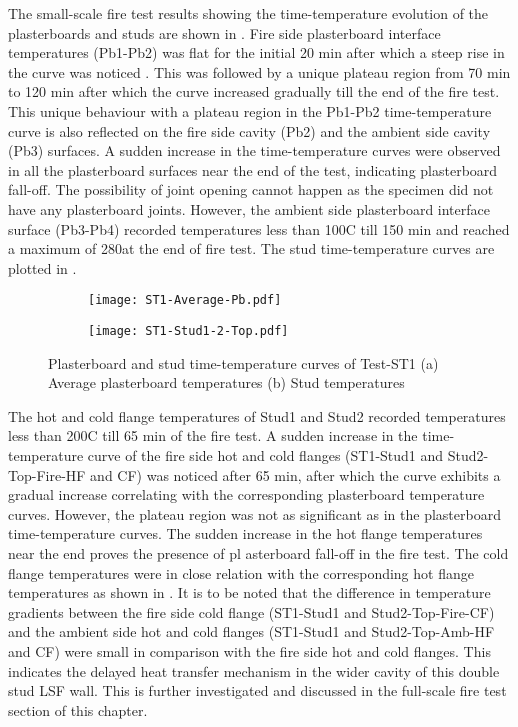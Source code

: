 The small-scale fire test results showing the time-temperature evolution of the plasterboards and studs are shown in . Fire side plasterboard interface temperatures (Pb1-Pb2) was flat for the initial 20 min after which a steep rise in the curve was noticed . This was followed by a unique plateau region from 70 min to 120 min after which the curve increased gradually till the end of the fire test. This unique behaviour with a plateau region in the Pb1-Pb2 time-temperature curve is also reflected on the fire side cavity (Pb2) and the ambient side cavity (Pb3) surfaces. A sudden increase in the time-temperature curves were observed in all the plasterboard surfaces near the end of the test, indicating plasterboard fall-off. The possibility of joint opening cannot happen as the specimen did not have any plasterboard joints. However, the ambient side plasterboard interface surface (Pb3-Pb4) recorded temperatures less than 100\degree C till 150 min and reached a maximum of 280\degree at the end of fire test. The stud time-temperature curves are plotted in .  
\begin{figure}[!htbp]
	\centering
	\begin{subfigure}[b]{0.7\textwidth}
		\centering
		\texttt{[image: ST1-Average-Pb.pdf]}
		\caption{}
		\label{subfig:ST1-Average-Pb}
	\end{subfigure}
	\begin{subfigure}[b]{0.7\textwidth}
		\centering
		\texttt{[image: ST1-Stud1-2-Top.pdf]}
		\caption{}
		\label{subfig:ST1-Stud1-2-Top}
	\end{subfigure}
	   \caption{Plasterboard and stud time-temperature curves of Test-ST1 (a) Average plasterboard temperatures (b) Stud temperatures}
	   \label{fig:ST1-PB-Stud}
\end{figure}

The hot and cold flange temperatures of Stud1 and Stud2 recorded temperatures less than 200\degree C till 65 min of the fire test. A sudden increase in the time-temperature curve of the fire side hot and cold flanges (ST1-Stud1 and Stud2-Top-Fire-HF and CF) was noticed after 65 min, after which the curve exhibits a gradual increase correlating with the corresponding plasterboard temperature curves. However, the plateau region was not as significant as in the plasterboard time-temperature curves. The sudden increase in the hot flange temperatures near the end proves the presence of pl
asterboard fall-off in the fire test. The cold flange temperatures were in close relation with the corresponding hot flange temperatures as shown in . It is to be noted that the difference in temperature gradients between the fire side cold flange (ST1-Stud1 and Stud2-Top-Fire-CF) and the ambient side hot and cold flanges (ST1-Stud1 and Stud2-Top-Amb-HF and CF) were small in comparison with the fire side hot and cold flanges. This indicates the delayed heat transfer mechanism in the wider cavity of this double stud LSF wall. This is further investigated and discussed in the full-scale fire test section of this chapter.

